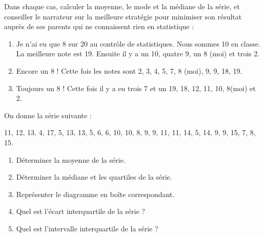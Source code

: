 \begin{exo}
Dans chaque cas, calculer la moyenne, le mode et la m\'ediane de la s\'erie, et conseiller le narrateur sur la meilleure strat\'egie pour minimiser son r\'esultat aupr\`es de ses parents qui ne connaissent rien en statistique :
\begin{enumerate}
	\item \og{} Je n'ai eu que 8 sur 20 au contrôle de statistiques. Nous sommes 10 en
classe. La meilleure note est 19. Ensuite il y a un 10, quatre 9, un 8 (moi) et trois 2. \fg
	\item \og{} Encore un 8 ! Cette fois les notes sont 2, 3, 4, 5, 7, 8  (moi), 9, 9, 18, 19. \fg
\item \og{} Toujours un 8 ! Cette fois il y a eu trois 7 et un 19, 18, 12, 11, 10, 8(moi) et 2. \fg
\end{enumerate}
\end{exo}


\begin{exo}
On donne la s\'erie suivante : \begin{center}
11, 12,  13, 4, 17, 5, 13, 13, 5, 6, 6, 10, 10, 8, 9, 9, 11, 11, 14, 5, 14, 9, 9, 15, 7, 8, 15.                                                                                                                              \end{center}
\begin{enumerate}
	\item D\'eterminer la moyenne de la s\'erie.
	\item D\'eterminer la m\'ediane et les quartiles de la s\'erie.
	\item Repr\'esenter le diagramme en bo\^ite correspondant.
	\item Quel est l'\'ecart interquartile de la s\'erie ?
	\item Quel est l'intervalle interquartile de la s\'erie ?
\end{enumerate}
\end{exo}

\sautpage

